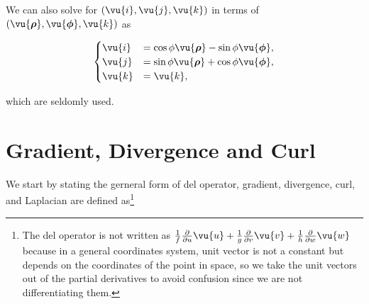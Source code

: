 \documentclass[english,a4paper,12pt]{report}
\begin{document}
We can also solve for \((\vu{i} , \vu{j}, \vu{k} )\) in terms of \((\vu{\boldsymbol{\rho } }, \vu{\boldsymbol{\phi } }, \vu{k} )\) as  

\begin{equation}
    \begin{cases}
        \vu{i} &= \cos \phi  \vu{\boldsymbol{\rho } } - \sin \phi \vu{\boldsymbol{\phi } }, \\
        \vu{j} &= \sin \phi \vu{\boldsymbol{\rho } } + \cos \phi \vu{\boldsymbol{\phi } }, \\
        \vu{k} &= \vu{k},
        \end{cases}
\end{equation}

which are seldomly used.











\section{Gradient, Divergence and Curl} 

We start by stating the gerneral form of del operator, gradient, divergence, curl, and Laplacian are defined as\footnote{The del operator is not written as \(\frac{1}{f} \frac{\partial}{\partial u}\vu{u}  + \frac{1}{g} \frac{\partial}{\partial v}\vu{v} + \frac{1}{h} \frac{\partial}{\partial w}\vu{w}\) because in a general coordinates system, unit vector is not a constant but depends on the coordinates of the point in space, so we take the unit vectors out of the partial derivatives to avoid confusion since we are not differentiating them.}
\end{document}

